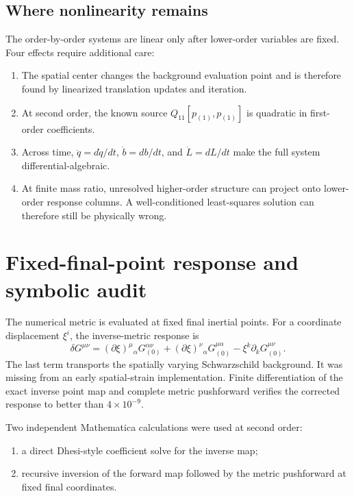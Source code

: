\documentclass[11pt]{article}
\newcommand{\G}{G}
\begin{document}
\subsection{Where nonlinearity remains}

The order-by-order systems are linear only after lower-order variables are
fixed.  Four effects require additional care:

\begin{enumerate}
  \item The spatial center changes the background evaluation point and is
        therefore found by linearized translation updates and iteration.
  \item At second order, the known source
        \(Q_{11}[p_{(1)},p_{(1)}]\) is quadratic in first-order coefficients.
  \item Across time, \(\ddot q=d\dot q/dt\), \(\dot b=db/dt\), and
        \(\dot L=dL/dt\) make the full system differential-algebraic.
  \item At finite mass ratio, unresolved higher-order structure can project
        onto lower-order response columns.  A well-conditioned least-squares
        solution can therefore still be physically wrong.
\end{enumerate}

\section{Fixed-final-point response and symbolic audit}

The numerical metric is evaluated at fixed final inertial points.  For a
coordinate displacement \(\xi^i\), the inverse-metric response is
\begin{equation}
\delta \G^{\mu\nu}
=
(\partial\xi)^\mu{}_\alpha\G_{(0)}^{\alpha\nu}
+(\partial\xi)^\nu{}_\alpha\G_{(0)}^{\mu\alpha}
-\xi^k\partial_k\G_{(0)}^{\mu\nu}.
\label{eq:fixed-response}
\end{equation}
The last term transports the spatially varying Schwarzschild background.  It
was missing from an early spatial-strain implementation.  Finite
differentiation of the exact inverse point map and complete metric
pushforward verifies the corrected response to better than
\(4\times10^{-9}\).

Two independent Mathematica calculations were used at second order:

\begin{enumerate}
  \item a direct Dhesi-style coefficient solve for the inverse map;
  \item recursive inversion of the forward map followed by the metric
        pushforward at fixed final coordinates.
\end{enumerate}
\end{document}

